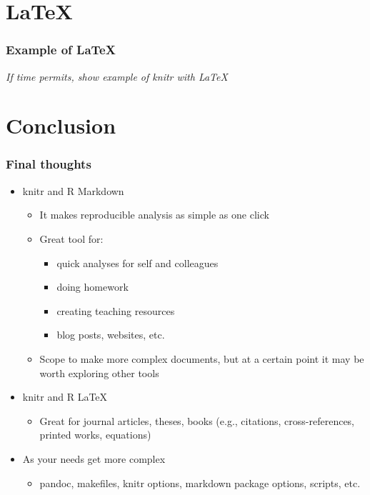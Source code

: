 \section{LaTeX}

\begin{frame}\frametitle{Example of LaTeX}

\emph{If time permits, show example of knitr with LaTeX}

\end{frame}

\section{Conclusion}

\begin{frame}\frametitle{Final thoughts}

\begin{itemize}
\item
  knitr and R Markdown

  \begin{itemize}
  \item
    It makes reproducible analysis as simple as one click
  \item
    Great tool for:

    \begin{itemize}
    \item
      quick analyses for self and colleagues
    \item
      doing homework
    \item
      creating teaching resources
    \item
      blog posts, websites, etc.
    \end{itemize}
  \item
    Scope to make more complex documents, but at a certain point it may
    be worth exploring other tools
  \end{itemize}
\item
  knitr and R LaTeX

  \begin{itemize}
  \item
    Great for journal articles, theses, books (e.g., citations,
    cross-references, printed works, equations)
  \end{itemize}
\item
  As your needs get more complex

  \begin{itemize}
  \item
    pandoc, makefiles, knitr options, markdown package options, scripts,
    etc.
  \end{itemize}
\end{itemize}

\end{frame}

